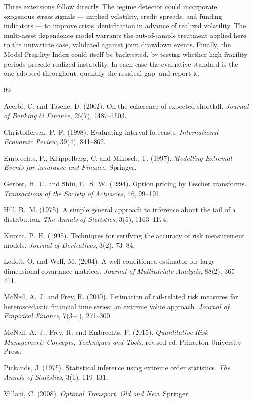 \documentclass[11pt]{article}
\theoremstyle{definition}
\begin{document}
Three extensions follow directly. The regime detector could incorporate exogenous
stress signals --- implied volatility, credit spreads, and funding indicators ---
to improve crisis identification in advance of realized volatility. The
multi-asset dependence model warrants the out-of-sample treatment applied here to
the univariate case, validated against joint drawdown events. Finally, the Model
Fragility Index could itself be backtested, by testing whether high-fragility
periods precede realized instability. In each case the evaluative standard is the
one adopted throughout: quantify the residual gap, and report it.

\begin{thebibliography}{99}
\small

Acerbi, C. and Tasche, D. (2002).
On the coherence of expected shortfall.
\textit{Journal of Banking \& Finance}, 26(7), 1487--1503.

Christoffersen, P.~F. (1998).
Evaluating interval forecasts.
\textit{International Economic Review}, 39(4), 841--862.

Embrechts, P., Kl\"uppelberg, C. and Mikosch, T. (1997).
\textit{Modelling Extremal Events for Insurance and Finance}.
Springer.

Gerber, H.~U. and Shiu, E.~S.~W. (1994).
Option pricing by Esscher transforms.
\textit{Transactions of the Society of Actuaries}, 46, 99--191.

Hill, B.~M. (1975).
A simple general approach to inference about the tail of a distribution.
\textit{The Annals of Statistics}, 3(5), 1163--1174.

Kupiec, P.~H. (1995).
Techniques for verifying the accuracy of risk measurement models.
\textit{Journal of Derivatives}, 3(2), 73--84.

Ledoit, O. and Wolf, M. (2004).
A well-conditioned estimator for large-dimensional covariance matrices.
\textit{Journal of Multivariate Analysis}, 88(2), 365--411.

McNeil, A.~J. and Frey, R. (2000).
Estimation of tail-related risk measures for heteroscedastic financial time
series: an extreme value approach.
\textit{Journal of Empirical Finance}, 7(3--4), 271--300.

McNeil, A.~J., Frey, R. and Embrechts, P. (2015).
\textit{Quantitative Risk Management: Concepts, Techniques and Tools}, revised ed.
Princeton University Press.

Pickands, J. (1975).
Statistical inference using extreme order statistics.
\textit{The Annals of Statistics}, 3(1), 119--131.

Villani, C. (2008).
\textit{Optimal Transport: Old and New}.
Springer.

\end{thebibliography}
\end{document}
